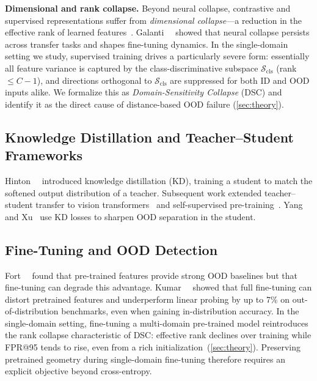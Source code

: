 \documentclass[runningheads]{llncs}
\begin{document}
\noindent\textbf{Dimensional and rank collapse.}
Beyond neural collapse, contrastive and supervised representations suffer from \emph{dimensional collapse}---a reduction in the effective rank of learned features~\cite{Jing2022rank}.
Galanti~\etal~\cite{Galanti2022collapse} showed that neural collapse persists across transfer tasks and shapes fine-tuning dynamics.
In the single-domain setting we study, supervised training drives a particularly severe form: essentially all feature variance is captured by the class-discriminative subspace $\mathcal{S}_{\mathrm{cls}}$ (rank $\leq C{-}1$), and directions orthogonal to $\mathcal{S}_{\mathrm{cls}}$ are suppressed for both ID and OOD inputs alike.
We formalize this as \emph{Domain-Sensitivity Collapse} (DSC) and identify it as the direct cause of distance-based OOD failure (\cref{sec:theory}).

\subsection{Knowledge Distillation and Teacher--Student Frameworks}
\label{sec:related:kd}

Hinton~\etal~\cite{Hinton2015kd} introduced knowledge distillation (KD), training a student to match the softened output distribution of a teacher.
Subsequent work extended teacher--student transfer to vision transformers~\cite{Touvron2021deit} and self-supervised pre-training~\cite{Caron2021dino,Oquab2024dinov2}.
Yang and Xu~\cite{Yang2025pskd} use KD losses to sharpen OOD separation in the student.


\subsection{Fine-Tuning and OOD Detection}
\label{sec:related:ft}

Fort~\etal~\cite{Fort2021pretrained} found that pre-trained features provide strong OOD baselines but that fine-tuning can degrade this advantage.
Kumar~\etal~\cite{Kumar2022lp} showed that full fine-tuning can distort pretrained features and underperform linear probing by up to 7\% on out-of-distribution benchmarks, even when gaining in-distribution accuracy.
In the single-domain setting, fine-tuning a multi-domain pre-trained model reintroduces the rank collapse characteristic of DSC: effective rank declines over training while FPR@95 tends to rise, even from a rich initialization~(\cref{sec:theory}).
Preserving pretrained geometry during single-domain fine-tuning therefore requires an explicit objective beyond cross-entropy.
\end{document}
